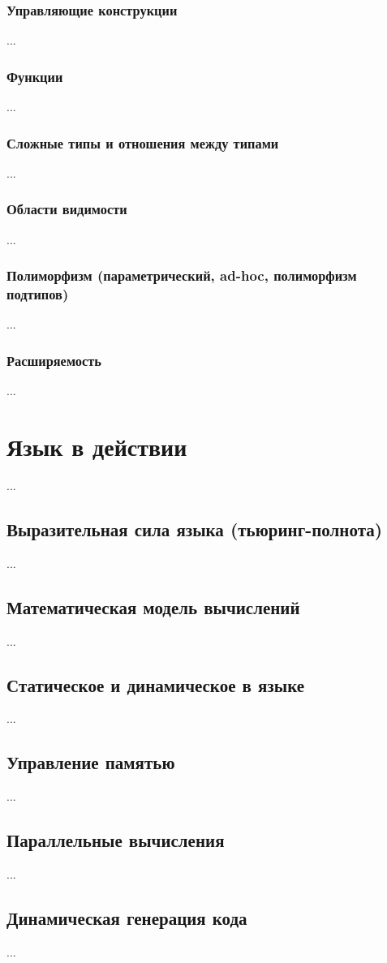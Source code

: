 \documentclass[11pt]{book}
\begin{document}
\subsubsection{Управляющие конструкции}
...
\subsubsection{Функции}
...
\subsubsection{Сложные типы и отношения между типами}
...
\subsubsection{Области видимости}
...
\subsubsection{Полиморфизм (параметрический, ad-hoc, полиморфизм подтипов)}
...
\subsubsection{Расширяемость}
...
\section{Язык в действии}
...
\subsection{Выразительная сила языка (тьюринг-полнота)}
...
\subsection{Математическая модель вычислений}
...
\subsection{Статическое и динамическое в языке}
...
\subsection{Управление памятью}
...
\subsection{Параллельные вычисления}
...
\subsection{Динамическая генерация кода}
...
\end{document}
